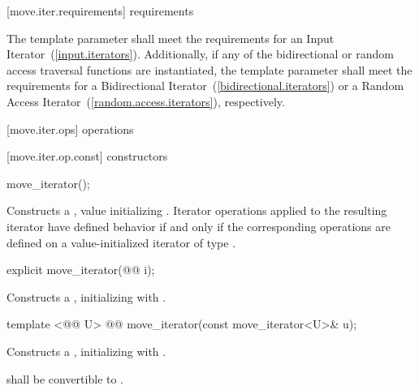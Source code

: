 \begin{removedblock}
[move.iter.requirements]{ requirements}

\pnum
The template parameter  shall meet
the requirements for an Input Iterator~(\ref{input.iterators}).
Additionally, if any of the bidirectional or random access traversal
functions are instantiated, the template parameter shall meet the
requirements for a Bidirectional Iterator~(\ref{bidirectional.iterators})
or a Random Access Iterator~(\ref{random.access.iterators}), respectively.
\end{removedblock}

[move.iter.ops]{ operations}

[move.iter.op.const]{ constructors}

%
\begin{itemdecl}
move_iterator();
\end{itemdecl}

\begin{itemdescr}
\pnum
\effects Constructs a , value
initializing . Iterator operations applied to the resulting
iterator have defined behavior if and only if the corresponding operations are defined
on a value-initialized iterator of type .
\end{itemdescr}


%
\begin{itemdecl}
explicit move_iterator(@@ i);
\end{itemdecl}

\begin{itemdescr}
\pnum
\effects Constructs a , initializing
 with .
\end{itemdescr}


%
\begin{itemdecl}
template <@@ U>
  @@
move_iterator(const move_iterator<U>& u);
\end{itemdecl}

\begin{itemdescr}
\pnum
\effects Constructs a , initializing
 with .

\begin{removedblock}
\pnum
\requires {} shall be convertible to
.
\end{removedblock}
\end{itemdescr}


